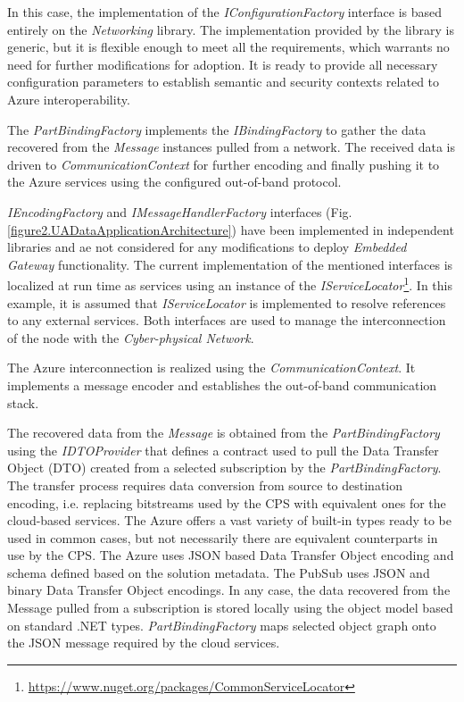 \documentclass[runningheads]{llncs}
\begin{document}
In this case, the implementation of the \emph{IConfigurationFactory} interface is based entirely on the \emph{Networking} library. The implementation provided by the library is generic, but it is flexible enough to meet all the requirements, which warrants no need for further modifications for adoption. It is ready to provide all necessary configuration parameters to establish semantic and security contexts related to Azure interoperability.

The \emph{PartBindingFactory} implements the \emph{IBindingFactory} to gather the data recovered from the \emph{Message} instances pulled from a network. The received data is driven to \emph{CommunicationContext} for further encoding and finally pushing it to the Azure services using the configured out-of-band protocol.

\emph{IEncodingFactory} and \emph{IMessageHandlerFactory} interfaces (Fig. \ref{figure2.UADataApplicationArchitecture}) have been implemented in independent libraries and ae not considered for any modifications to deploy \emph{Embedded Gateway} functionality. The current implementation of the mentioned interfaces is localized at run time as services using an instance of the \emph{IServiceLocator}\footnote{ \url{https://www.nuget.org/packages/CommonServiceLocator} }. In this example, it is assumed that \emph{IServiceLocator} is implemented to resolve references to any external services. Both interfaces are used to manage the interconnection of the node with the \emph{Cyber-physical Network}.

The Azure interconnection is realized using the \emph{CommunicationContext}. It implements a message encoder and establishes the out-of-band communication stack.

The recovered data from the \emph{Message} is obtained from the \emph{PartBindingFactory} using the \emph{IDTOProvider} that defines a contract used to pull the Data Transfer Object (DTO) created from a selected subscription by the \emph{PartBindingFactory}. The transfer process requires data conversion from source to destination encoding, i.e. replacing bitstreams used by the CPS with equivalent ones for the cloud-based services. The Azure offers a vast variety of built-in types ready to be used in common cases, but not necessarily there are equivalent counterparts in use by the CPS. The Azure uses JSON based Data Transfer Object encoding and schema defined based on the solution metadata. The PubSub uses JSON and binary Data Transfer Object encodings. In any case, the data recovered from the Message pulled from a subscription is stored locally using the object model based on standard .NET types. \emph{PartBindingFactory} maps selected object graph onto the JSON message required by the cloud services.
\end{document}
